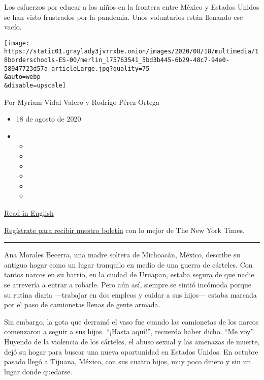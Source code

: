 Los esfuerzos por educar a los niños en la frontera entre México y
Estados Unidos se han visto frustrados por la pandemia. Unos voluntarios
están llenando ese vacío.

\texttt{[image: https://static01.graylady3jvrrxbe.onion/images/2020/08/18/multimedia/18borderschools-ES-00/merlin\_175763541\_5bd3b445-6b29-48c7-94e0-58947723d57a-articleLarge.jpg?quality=75\\\&auto=webp\\\&disable=upscale]}

Por Myriam Vidal Valero y Rodrigo Pérez Ortega

\begin{itemize}
\item
  18 de agosto de 2020
\item
  \begin{itemize}
  \item
  \item
  \item
  \item
  \item
  \item
  \end{itemize}
\end{itemize}

\href{https://www.nytimes3xbfgragh.onion/2020/08/18/parenting/migrant-children-school-border.html}{Read
in English}

\href{https://www.nytimes3xbfgragh.onion/newsletters/el-times}{Regístrate
para recibir nuestro boletín} con lo mejor de The New York Times.

\begin{center}\rule{0.5\linewidth}{\linethickness}\end{center}

Ana Morales Becerra, una madre soltera de Michoacán, México, describe su
antiguo hogar como un lugar tranquilo en medio de una guerra de
cárteles. Con tantos narcos en su barrio, en la ciudad de Uruapan,
estaba segura de que nadie se atrevería a entrar a robarle. Pero aún
así, siempre se sintió incómoda porque su rutina diaria ---trabajar en
dos empleos y cuidar a sus hijos--- estaba marcada por el paso de
camionetas llenas de gente armada.

Sin embargo, la gota que derramó el vaso fue cuando las camionetas de
los narcos comenzaron a seguir a sus hijos. ``¡Hasta aquí!'', recuerda
haber dicho. ``Me voy''. Huyendo de la violencia de los cárteles, el
abuso sexual y las amenazas de muerte, dejó su hogar para buscar una
nueva oportunidad en Estados Unidos. En octubre pasado llegó a Tijuana,
México, con sus cuatro hijos, muy poco dinero y sin un lugar donde
quedarse.

